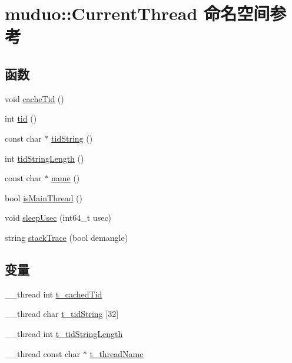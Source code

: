 \hypertarget{namespacemuduo_1_1CurrentThread}{}\section{muduo\+:\+:Current\+Thread 命名空间参考}
\label{namespacemuduo_1_1CurrentThread}
\subsection*{函数}
\begin{DoxyCompactItemize}
\item 
void \hyperlink{namespacemuduo_1_1CurrentThread_a09cc852243e579266304c5e31f744929}{cache\+Tid} ()
\item 
int \hyperlink{namespacemuduo_1_1CurrentThread_a27129392a2d642e96188636257bf13ca}{tid} ()
\item 
const char $\ast$ \hyperlink{namespacemuduo_1_1CurrentThread_a66a1e1728583966e9568ae57562a6e93}{tid\+String} ()
\item 
int \hyperlink{namespacemuduo_1_1CurrentThread_a8f000c3381de23423f1c582b116f8b81}{tid\+String\+Length} ()
\item 
const char $\ast$ \hyperlink{namespacemuduo_1_1CurrentThread_adc8b0cfe3a876d8edf272f982ea2c014}{name} ()
\item 
bool \hyperlink{namespacemuduo_1_1CurrentThread_ad8869cd6e09d4440fae5d6698558b3a5}{is\+Main\+Thread} ()
\item 
void \hyperlink{namespacemuduo_1_1CurrentThread_ab625c2286c356d09b66b9ab043946fd1}{sleep\+Usec} (int64\+\_\+t usec)
\item 
string \hyperlink{namespacemuduo_1_1CurrentThread_adb3a86b79370bd58610e2b8942980edf}{stack\+Trace} (bool demangle)
\end{DoxyCompactItemize}
\subsection*{变量}
\begin{DoxyCompactItemize}
\item 
\+\_\+\+\_\+thread int \hyperlink{namespacemuduo_1_1CurrentThread_a0ac6156a2e940999b6e5079f74aed168}{t\+\_\+cached\+Tid}
\item 
\+\_\+\+\_\+thread char \hyperlink{namespacemuduo_1_1CurrentThread_a2d20a2a5e4356ebe49586292d41e6194}{t\+\_\+tid\+String} \mbox{[}32\mbox{]}
\item 
\+\_\+\+\_\+thread int \hyperlink{namespacemuduo_1_1CurrentThread_a9c737bf86b45092ffa7d2eba19767a50}{t\+\_\+tid\+String\+Length}
\item 
\+\_\+\+\_\+thread const char $\ast$ \hyperlink{namespacemuduo_1_1CurrentThread_a34c6e52202ddb3c43a4af8ad4b36e3f9}{t\+\_\+thread\+Name}
\end{DoxyCompactItemize}


